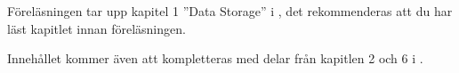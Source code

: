 Föreläsningen tar upp kapitel 1 ''Data Storage'' i \citep{Brookshear2012csa}, 
det rekommenderas att du har läst kapitlet innan föreläsningen.

Innehållet kommer även att kompletteras med delar från kapitlen 2 och 
6 i \cite{Bosk2011m1c}.
